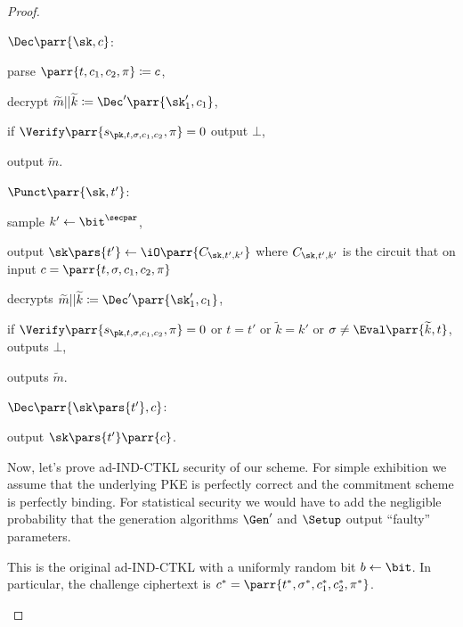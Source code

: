 \begin{proof}
\begin{sitemize}
        \item \(\Dec\parr{\sk,c}\):
        \begin{sitemize}
            \item parse \(\parr{t,c_1,c_2,\pi} \coloneqq c\),
            \item decrypt \(\widetilde{m}||\widetilde{k} \coloneqq \Dec'\parr{\sk'_1,c_1}\),
            \item if \(\Verify\parr{s_{\pk,t,\sigma,c_1,c_2},\pi} = 0\) output \(\bot\),
            \item output \(\widetilde{m}\).
        \end{sitemize}

        \item \(\Punct\parr{\sk, t'}\):
        \begin{sitemize}
            \item sample \(k' \gets \bit^\secpar\),
            \item output \(\sk\pars{t'} \gets \iO\parr{C_{\sk,t',k'}}\) where \(C_{\sk,t',k'}\) is the circuit that on input \(c = \parr{t,\sigma,c_1,c_2,\pi}\)
            \begin{sitemize}
                \item decrypts \(\widetilde{m}||\widetilde{k} \coloneqq \Dec'\parr{\sk'_1,c_1}\),
                \item if \(\Verify\parr{s_{\pk,t,\sigma,c_1,c_2},\pi} = 0\) or \(t = t'\) or \(\widetilde{k} = k'\) or \(\sigma \neq \Eval\parr{\widetilde{k},t}\), outputs \(\bot\),
                \item outputs \(\widetilde{m}\).
            \end{sitemize}
        \end{sitemize}

        \item \(\Dec\parr{\sk\pars{t'},c}\):
        \begin{sitemize}
            \item output \(\sk\pars{t'}\parr{c}\).
        \end{sitemize}
    \end{sitemize}
    Now, let's prove ad-IND-CTKL security of our scheme.
    For simple exhibition we assume that the underlying PKE is perfectly correct and the commitment scheme is perfectly binding.
    For statistical security we would have to add the negligible probability that the generation algorithms \(\Gen'\) and \(\Setup\) output \enquote{faulty} parameters.
    \begin{hybrids}
        \item This is the original ad-IND-CTKL with a uniformly random bit \(b \gets \bit\).
        In particular, the challenge ciphertext is \(c^* = \parr{t^*,\sigma^*,c^*_1,c^*_2,\pi^*}\).


\end{hybrids}
\end{proof}
